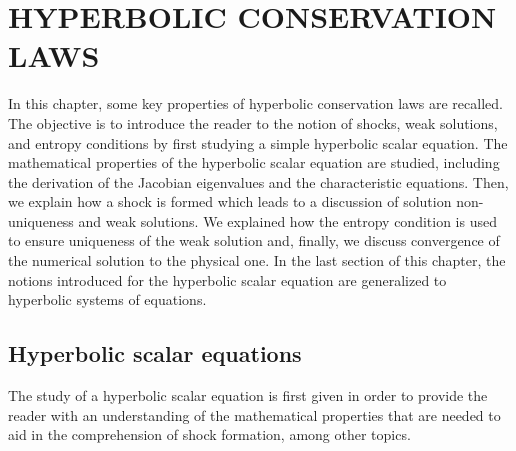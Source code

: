 %
%
%

%
\chapter{\uppercase {Hyperbolic conservation laws}}\label{chap:theory_chp1}
%
In this chapter, some key properties of hyperbolic conservation laws are recalled. The objective is to introduce the reader to the notion of shocks, weak solutions, and entropy conditions by first studying a simple hyperbolic scalar equation. The mathematical properties of the hyperbolic scalar equation are studied, including the derivation of the Jacobian eigenvalues and the characteristic equations. Then, we explain how a shock is formed which leads to a discussion of solution non-uniqueness and weak solutions. We explained how the entropy condition is used to ensure uniqueness of the weak solution and, finally, we discuss convergence of the numerical solution to the physical one. In the last section of this chapter, the notions introduced for the hyperbolic scalar equation are generalized to hyperbolic systems of equations.

\section{Hyperbolic scalar equations}\label{sec:hyp_scalar_sct1b}

The study of a hyperbolic scalar equation is first given in order to provide the reader with an understanding of the  mathematical properties that are needed to aid in the comprehension of shock formation, among other topics.

